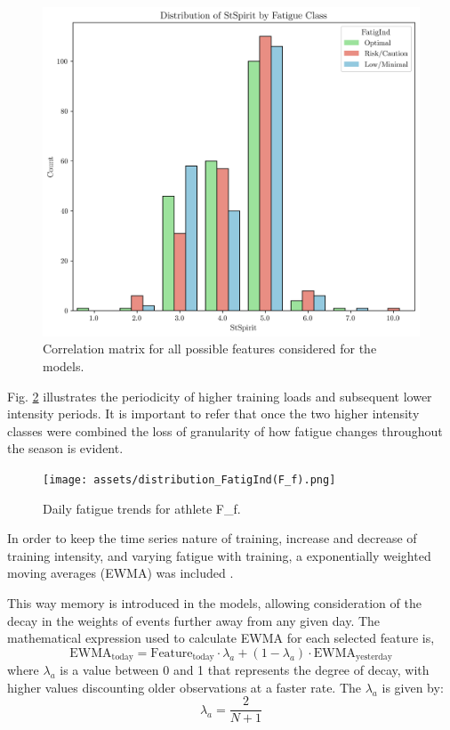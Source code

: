 \documentclass[conference]{IEEEtran}
\begin{document}
\begin{figure}[H]
    \centering
    \includegraphics[width=1\linewidth]{assets/distribution_StSpirit.png}
    \caption{Correlation matrix for all possible features considered for the models.}
    \label{distStSpirit}
\end{figure} %

Fig. \ref{fatig_Ff} illustrates the periodicity of higher training loads and subsequent lower intensity periods. It is important to refer that once the two higher intensity classes were combined the loss of granularity of how fatigue changes throughout the season is evident.  
\begin{figure}[H]
    \centering
    \texttt{[image: assets/distribution\_FatigInd(F\_f).png]}
    \caption{Daily fatigue trends for athlete F\_f.}
    \label{fatig_Ff}
\end{figure} %

In order to keep the time series nature of training, increase and decrease of training intensity, and varying fatigue with training, a exponentially weighted moving averages (EWMA) was included \cite{Williams17}.

This way memory is introduced in the models, allowing consideration of the decay in the weights of events further away from any given day. The mathematical expression used to calculate EWMA for each selected feature is,
\begin{equation*}
    \text{EWMA}_{\text{today}} = \text{Feature}_{\text{today}} \cdot \lambda_a + (1 - \lambda_a) \cdot \text{EWMA}_{\text{yesterday}}
\end{equation*}
where $\lambda_a$ is a value between 0 and 1 that represents the degree of decay, with higher values discounting older observations at a faster rate. The $\lambda_a$ is given by:
\begin{equation*}
    \lambda_a = \frac{2}{N + 1}
\end{equation*} 
\end{document}
